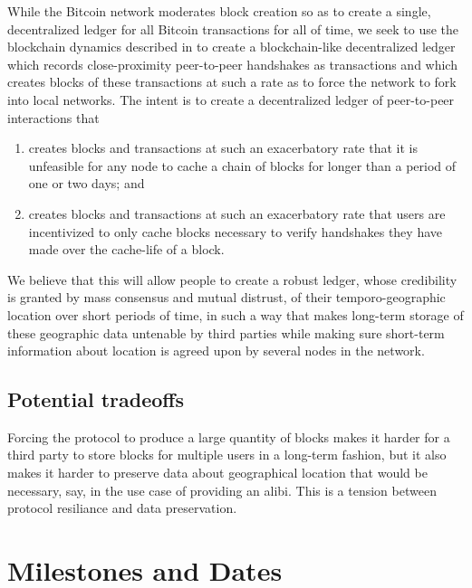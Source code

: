 \documentclass{article}
\begin{document}
While the Bitcoin network moderates block creation so as to create a single,
decentralized ledger for all Bitcoin transactions for all of time, we seek to use
the blockchain dynamics described in \cite{decker_2013} to create a
blockchain-like decentralized ledger which records close-proximity peer-to-peer
handshakes as transactions and which creates blocks of these transactions at such
a rate as to force the network to fork into local networks. The intent is to
create a decentralized ledger of peer-to-peer interactions that
\begin{enumerate}
	\item creates blocks and transactions at such an exacerbatory rate that
		it is unfeasible for any node to cache a chain of blocks for
		longer than a period of one or two days; and
	\item creates blocks and transactions at such an exacerbatory rate that
		users are incentivized to only cache blocks necessary to verify
		handshakes they have made over the cache-life of a block.
\end{enumerate}
We believe that this will allow people to create a robust ledger, whose
credibility is granted by mass consensus and mutual distrust, of their temporo-geographic
location over short periods of time, in such a way that makes long-term storage of these
geographic data untenable by third parties while making sure short-term
information about location is agreed upon by several nodes in the network.

\subsection*{Potential tradeoffs}

Forcing the protocol to produce a large quantity of blocks
makes it harder for a third party to store blocks for multiple users in a long-term fashion,
but it also makes it harder to preserve data about geographical location
that would be necessary, say, in the use case of providing an alibi.
This is a tension between protocol resiliance and data preservation.

\section*{Milestones and Dates}
\end{document}
